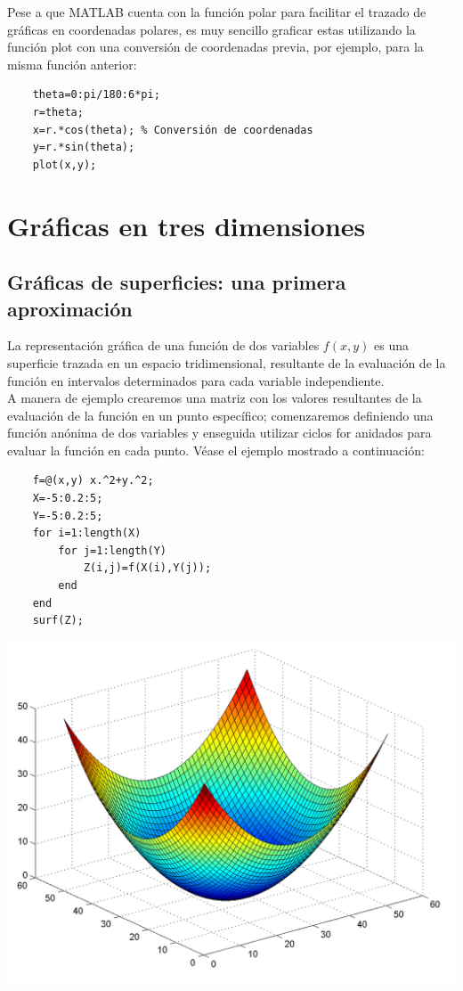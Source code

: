 Pese a que MATLAB cuenta con la función polar para facilitar el trazado de gráficas en 
coordenadas polares, es muy sencillo graficar estas utilizando la función plot con una 
conversión de coordenadas previa, por ejemplo, para la misma función anterior:

\begin{verbatim}
	theta=0:pi/180:6*pi;
	r=theta;
	x=r.*cos(theta); % Conversión de coordenadas 
	y=r.*sin(theta);
	plot(x,y);
\end{verbatim}

\section{Gráficas en tres dimensiones}

\subsection{Gráficas de superficies: una primera aproximación}

La representación gráfica de una función de dos variables $f(x,y)$ es una superficie 
trazada en un espacio tridimensional, resultante de la evaluación de la función en 
intervalos determinados para cada variable independiente.\\

A manera de ejemplo crearemos una matriz con los valores resultantes de la evaluación 
de la función en un punto específico; comenzaremos definiendo una función anónima de 
dos variables y enseguida utilizar ciclos for anidados para evaluar la función en 
cada punto. Véase el ejemplo mostrado a continuación:

\begin{verbatim}
	f=@(x,y) x.^2+y.^2;
	X=-5:0.2:5;
	Y=-5:0.2:5;
	for i=1:length(X)
	    for j=1:length(Y)
	        Z(i,j)=f(X(i),Y(j));
	    end
	end
	surf(Z);
\end{verbatim}

\begin{center}
\includegraphics[scale=0.6]{src/ch4/img_4_7.png}
\end{center}

